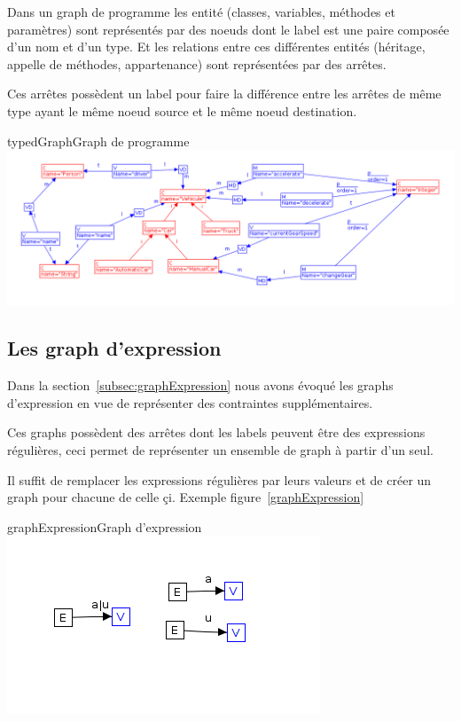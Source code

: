 \documentclass[a4paper, 12pt]{article}
\begin{document}
Dans un graph de programme les entité (classes, variables, méthodes et paramètres) sont représentés par des noeuds dont le label est une paire composée d'un nom et d'un type. Et les relations entre ces différentes entités (héritage, appelle de méthodes, appartenance) sont représentées par des arrêtes. 

Ces arrêtes possèdent un label pour faire la différence entre les arrêtes de même type ayant le même noeud source et le même noeud destination.

\begin{myfig}{typedGraph}{Graph de programme}
\includegraphics[width=\textwidth]{typedGraph.png}
\end{myfig}

\subsection{Les graph d'expression} 

Dans la section~\ref{subsec:graphExpression} nous avons évoqué les graphs d'expression en vue de représenter des contraintes supplémentaires. 

Ces graphs possèdent des arrêtes dont les labels peuvent être des expressions régulières, ceci permet de représenter un ensemble de graph à partir d'un seul.

Il suffit de remplacer les expressions régulières par leurs valeurs et de créer un graph pour chacune de celle çi. Exemple figure~\ref{graphExpression}

\begin{myfig}{graphExpression}{Graph d'expression}
\includegraphics{graphExpression.png}
\end{myfig}
\end{document}
